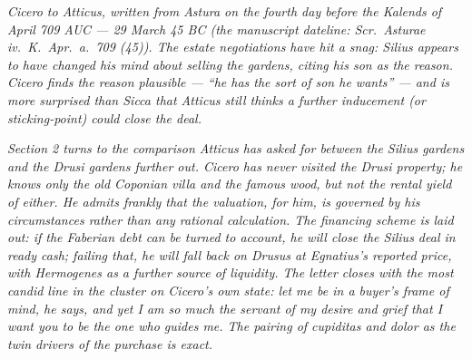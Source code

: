 
\textit{Cicero to Atticus, written from Astura on the
fourth day before the Kalends of April 709 AUC ---
29 March 45 BC (the manuscript dateline:
\textit{Scr.\ Asturae iv.\ K.\ Apr.\ a.\ 709 (45)}).
The estate negotiations have hit a snag: Silius
appears to have changed his mind about selling the
gardens, citing his son as the reason. Cicero finds
the reason plausible --- ``he has the sort of son he
wants'' --- and is more surprised than Sicca that
Atticus still thinks a further inducement (or
sticking-point) could close the deal.}

\textit{Section 2 turns to the comparison Atticus has
asked for between the Silius gardens and the Drusi
gardens further out. Cicero has never visited the
Drusi property; he knows only the old Coponian villa
and the famous wood, but not the rental yield of
either. He admits frankly that the valuation, for
him, is governed by his circumstances rather than
any rational calculation. The financing scheme is
laid out: if the Faberian debt can be turned to
account, he will close the Silius deal in ready
cash; failing that, he will fall back on Drusus at
Egnatius's reported price, with Hermogenes as a
further source of liquidity. The letter closes with
the most candid line in the cluster on Cicero's own
state: let me be in a buyer's frame of mind, he
says, and yet I am so much the servant of my desire
and grief that I want you to be the one who guides
me. The pairing of \textit{cupiditas} and
\textit{dolor} as the twin drivers of the purchase
is exact.}
